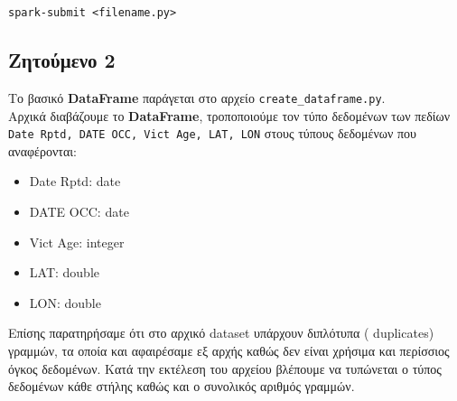 \documentclass{article}
\begin{document}
\begin{center}
\texttt{spark-submit <filename.py>}
\end{center}

\subsection{Ζητούμενο 2}
\label{subsec:Z2}
Το βασικό  \textbf{DataFrame}  παράγεται στο αρχείο  \texttt{create\_dataframe.py}.\\
 Αρχικά διαβάζουμε το  \textbf{DataFrame}, τροποποιούμε τον τύπο δεδομένων των πεδίων  \texttt{Date Rptd, DATE OCC, Vict Age, LAT, LON}  στους τύπους δεδομένων που αναφέρονται:
\begin{itemize}
    \item   Date Rptd: date
    \item   DATE OCC:  date
    \item   Vict Age:  integer
    \item   LAT:       double
    \item   LON:       double
\end{itemize}
Επίσης παρατηρήσαμε ότι στο αρχικό dataset  υπάρχουν διπλότυπα ( duplicates)  γραμμών, τα οποία και αφαιρέσαμε εξ αρχής καθώς δεν είναι χρήσιμα και περίσσιος όγκος δεδομένων. Κατά την εκτέλεση του αρχείου βλέπουμε να τυπώνεται ο τύπος δεδομένων κάθε στήλης καθώς και ο συνολικός αριθμός γραμμών.
\end{document}
